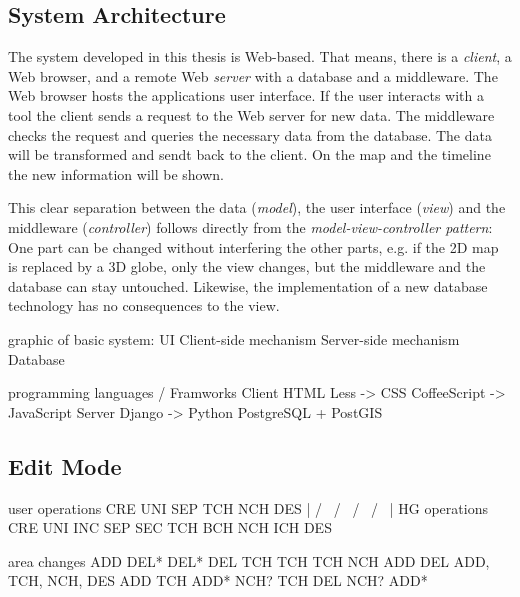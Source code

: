 
\subsection{System Architecture} %
\label{sub:system_architecture}


The system developed in this thesis is Web-based. That means, there is a \emph{client}, a Web browser, and a remote Web \emph{server} with a database and a middleware. The Web browser hosts the applications user interface. If the user interacts with a tool the client sends a request to the Web server for new data. The middleware checks the request and queries the necessary data from the database. The data will be transformed and sendt back to the client. On the map and the timeline the new information will be shown.

This clear separation between the data (\emph{model}), the user interface (\emph{view}) and the middleware (\emph{controller}) follows directly from the \emph{model-view-controller pattern}: One part can be changed without interfering the other parts, e.g. if the 2D map is replaced by a 3D globe, only the view changes, but the middleware and the database can stay untouched. Likewise, the implementation of a new database technology has no consequences to the view.


graphic of basic system:
UI
Client-side mechanism
Server-side mechanism
Database

programming languages / Framworks
Client                    HTML
          Less ->         CSS
          CoffeeScript -> JavaScript
Server    Django ->       Python
                          PostgreSQL
                          + PostGIS


\subsection{Edit Mode} %
\label{sub:edit_mode}


user operations     CRE     UNI          SEP         TCH         NCH      DES
                     |      / \         /   \        /  \       /   \      |
HG operations       CRE   UNI   INC   SEP   SEC   TCH   BCH   NCH   ICH   DES

area changes        ADD   DEL*  DEL*  DEL   TCH   TCH   TCH   NCH   ADD   DEL
ADD, TCH, NCH, DES        ADD   TCH   ADD*  NCH?        TCH         DEL
                                NCH?        ADD*


